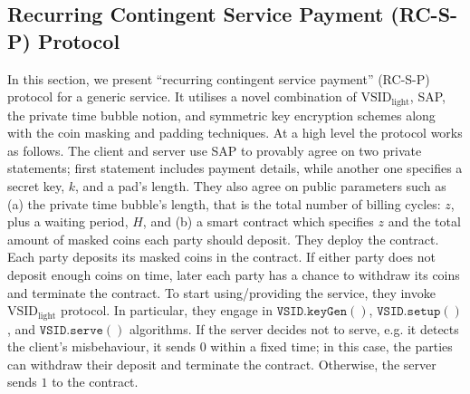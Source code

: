 

\subsection{Recurring Contingent Service Payment (RC-S-P) Protocol}


 
 
 In this section, we present  ``recurring contingent service payment'' (RC-S-P) protocol for a generic service. It utilises a novel combination of $\text{VSID}_{\scriptscriptstyle\text{light}}$, SAP, the private time bubble notion, and symmetric key encryption schemes along with the coin masking and padding techniques. At a high level the protocol works as follows.  The  client and server use SAP to provably agree on two private statements; first statement includes  payment details, while another one specifies a secret key, $k$, and a pad's length. They also  agree on  public parameters such as (a) the private time bubble's length, that is the total number of billing cycles: $z$, plus a waiting period, $H$, and (b) a smart contract which  specifies $z$ and  the total amount of masked coins each party should deposit. They deploy the contract.  Each party deposits its masked coins in the contract. If either party does not deposit enough coins on time,   later each party has a chance to withdraw its coins and terminate the contract. To start using/providing the service, they invoke $\text{VSID}_{\scriptscriptstyle\text{light}}$ protocol. In particular, they engage in   $\mathtt{VSID.keyGen}()$, $\mathtt{VSID.setup}()$, and $\mathtt{VSID.serve}()$ algorithms. If the server decides not to serve, e.g. it detects the client's misbehaviour,  it sends $0$  within a fixed time; in this case, the parties can withdraw their deposit and terminate the contract. Otherwise, the server sends $1$ to the contract. 
 
